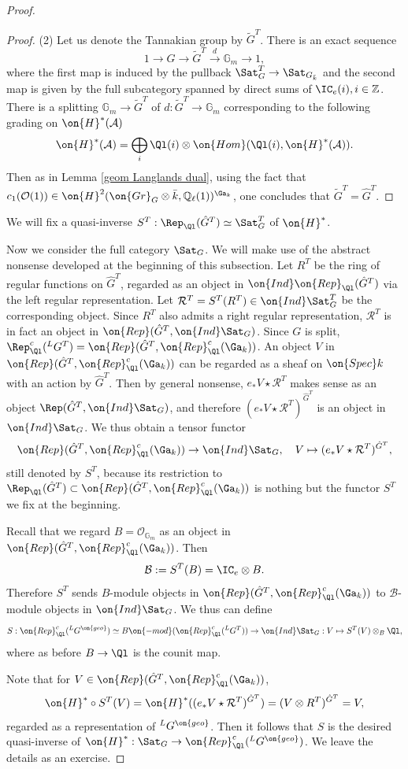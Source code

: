\documentclass[]{pcmi}
\theoremstyle{plain}
\theoremstyle{remark}
\theoremstyle{definition}
\newcommand{\bG}{{\mathbb G}}
\newcommand{\bQ}{{\mathbb Q}}
\newcommand{\bZ}{{\mathbb Z}}
\newcommand{\mA}{{\mathcal A}}
\newcommand{\mB}{{\mathcal B}}
\newcommand{\mO}{{\mathcal O}}
\newcommand{\mR}{{\mathcal R}}
\newcommand{\Gr}{{\on{Gr}}}
\newcommand{\Hom}{{\on{Hom}}}
\newcommand{\Spec}{\on{Spec}}
\begin{document}
\begin{proof}
\begin{proof}
(2) Let us denote  the Tannakian group by $\tilde G^T$. There is an exact sequence
\[1\to \hat G\to \tilde G^T\stackrel{d}{\to} \bG_m\to 1,\]
where the first map is induced by the pullback $\Sat_G^T\to \Sat_{G_{\bar k}}$ and the second map is given by the full subcategory spanned by direct sums of $\IC_e(i), i\in\bZ$. There is a splitting $\bG_m\to \tilde G^T$ of $d:\tilde G^T\to \bG_m$
corresponding to the following grading on $\on{H}^*(\mA)$
$$\on{H}^*(\mA)=\bigoplus_i \Ql(i)\otimes \Hom(\Ql(i), \on{H}^*(\mA)).$$
Then as in Lemma \ref{geom Langlands dual},  using the fact that $c_1(\mO(1))\in \on{H}^2(\Gr_G\otimes\bar k,\bQ_\ell(1))^{\Ga_k}$, one concludes that $\tilde G^T=\hat G^T$.
\end{proof}

We will fix a quasi-inverse $S^T: \Rep_\Ql(\hat G^T)\simeq \Sat_G^T$ of $\on{H}^*$.


Now we consider the full category $\Sat_G$. 
We will make use of the abstract nonsense developed at the beginning of this subsection. Let $R^T$ be the ring of regular functions on $\hat G^T$, regarded as an object in $\on{Ind}\on{Rep}_{\Ql}(\hat G^T)$ via the left regular representation. Let $\mR^T=S^T(R^T)\in \on{Ind}\Sat^T_G$ be the corresponding object. Since $R^T$ also admits a right regular representation, $\mR^T$ is in fact an object in $\on{Rep}(\hat G^T,{\on{Ind}\Sat_G})$. Since $G$ is split, $\Rep^c_\Ql({^L}G^T)=\on{Rep}(\hat G^T,{\on{Rep}^c_{\Ql}(\Ga_k)})$. An object $V$ in $\on{Rep}(\hat G^T,{\on{Rep}^c_{\Ql}(\Ga_k)})$ can be regarded as a sheaf on $\Spec k$ with an action by $\hat G^T$. Then by general nonsense, $e_*V\star\mR^T$ makes sense as an  object $\Rep(\hat G^T, \on{Ind}\Sat_G)$, and therefore $(e_*V\star \mR^T)^{\hat G^T}$ is an object in $\on{Ind}\Sat_G$. We thus obtain a tensor functor
\[ \on{Rep}(\hat G^T,{\on{Rep}^c_{\Ql}(\Ga_k)})\to \on{Ind}\Sat_G,\quad V\mapsto (e_*V\star \mR^T)^{\hat G^T},\]
still denoted by $S^T$, because its restriction to  $\Rep_\Ql(\hat G^T)\subset \on{Rep}(\hat G^T,{\on{Rep}^c_{\Ql}(\Ga_k)})$ is nothing but the functor $S^T$ we fix at the beginning.

Recall that we regard $B=\mO_{\bG_m}$ as an object in $\on{Rep}(\hat G^T,{\on{Rep}^c_{\Ql}(\Ga_k)})$. Then 
$$\mB:=S^T(B)= \IC_e\otimes B.$$
Therefore $S^T$ sends $B$-module objects in $\on{Rep}(\hat G^T,{\on{Rep}^c_{\Ql}(\Ga_k)})$ to $\mB$-module objects in $\on{Ind}\Sat_G$. We thus can define 
\[S: \on{Rep}^c_{\Ql}({^L}G^{\on{geo}})\simeq B\on{-mod}(\on{Rep}^c_{\Ql}({^L}G^T)) \to \on{Ind}\Sat_G: V\mapsto S^T(V)\otimes_{B}\Ql,\]
where as before $B\to\Ql$ is the counit map.

Note that for $V\in \on{Rep}(\hat G^T,{\on{Rep}^c_{\Ql}(\Ga_k)})$,
$$\on{H}^*\circ S^T(V)=\on{H}^*((e_*V\star \mR^T)^{\hat G^T})=(V\otimes R^T)^{\hat G^T}=V,$$ 
regarded as a representation of ${^L}G^{\on{geo}}$. Then it follows that $S$ is the desired quasi-inverse of $\on{H}^*:\Sat_G\to \on{Rep}^c_{\Ql}({^L}G^{\on{geo}})$. We leave the details as an exercise.
\end{proof}
\end{document}

